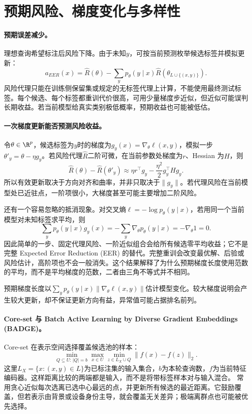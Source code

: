 \section{预期风险、梯度变化与多样性}
\paragraph{预期误差减少。}
理想查询希望标注后风险下降。由于未知$y$，可按当前预测枚举候选标签并模拟更新\cite{roy2001error}：
\begin{equation}
 a_{EER}(x)=\widehat R(\theta)
 -\sum_yp_\theta(y\mid x)\widehat R(\theta_{L\cup\{(x,y)\}}).
\end{equation}
风险代理只能在训练侧保留集或规定的无标签代理上计算，不能使用最终测试标签。每个候选、每个标签都重训代价很高，可用少量梯度步近似，但近似可能误判长期收益。若当前模型给真实类别极低概率，预期收益也可能被低估。

\paragraph{一次梯度更新能否预测风险收益。}
令$\theta\in\R^p$，候选标签为$y$时的梯度为$g_y(x)=\nabla_\theta\ell(x,y)$，模拟一步$\theta'_y=\theta-\eta g_y$。若风险代理$\widehat R$二阶可微，在当前参数处梯度为$r$、Hessian 为$H$，则
\begin{equation}
 \widehat R(\theta)-\widehat R(\theta'_y)
 \approx\eta r^\top g_y-\frac{\eta^2}{2}g_y^\top Hg_y.
\end{equation}
所以有效更新取决于方向对齐和曲率，并非只取决于$\|g_y\|$。若代理风险在当前模型处已近驻点，一阶项很小，大梯度甚至可能主要增加二阶风险。

还有一个容易忽略的抵消现象。对交叉熵$\ell=-\log p_\theta(y\mid x)$，若用同一个当前模型对未知标签求平均，则
\begin{equation}
 \sum_yp_\theta(y\mid x)g_y(x)
 =-\sum_y\nabla_\theta p_\theta(y\mid x)
 =-\nabla_\theta1=0.
\end{equation}
因此简单的一步、固定代理风险、一阶近似组合会给所有候选零平均收益；它不是完整 Expected Error Reduction (EER) 的替代。完整重训会改变最优解、后验或风险估计，高阶项也不会一般消失。这个结果解释了为什么预期梯度长度使用范数的平均，而不是平均梯度的范数，二者由三角不等式并不相同。

预期梯度长度以$\sum_yp_\theta(y\mid x)\|\nabla_\theta\ell(x,y)\|$估计模型变化。较大梯度说明会产生较大更新，却不保证更新方向有益，异常值可能占据排名前列。

\paragraph{Core-set 与 Batch Active Learning by Diverse Gradient Embeddings (BADGE)。}
Core-set 在表示空间选择覆盖候选池的样本\cite{sener2018coreset}：
\begin{equation}
 \min_{Q\subseteq U:\,|Q|=b}\max_{x\in U}\min_{z\in L_X\cup Q}
 \|f(x)-f(z)\|_2.
\end{equation}
这里$L_X=\{x:(x,y)\in L\}$为已标注集的输入集合，$b$为本轮查询数，$f$为当前特征编码器。这样距离比较的两端都是输入，而不是将带标签样本对与输入混合。
常用贪心近似每次选离已选中心最远的点，并更新所有候选的最近距离。它鼓励覆盖，但若表示由背景或设备身份主导，就会覆盖无关差异；极端离群点也可能被优先选择。

